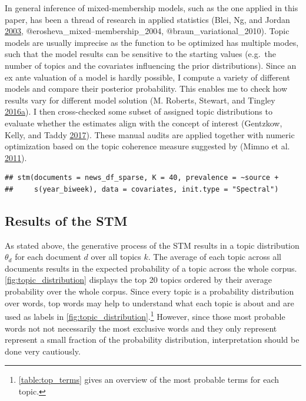 \documentclass[
]{article}
\begin{document}
In general inference of mixed-membership models, such as the one applied
in this paper, has been a thread of research in applied statistics
(Blei, Ng, and Jordan \protect\hyperlink{ref-blei_latent_2003}{2003},
@erosheva\_mixed--membership\_2004, @braun\_variational\_2010). Topic
models are usually imprecise as the function to be optimized has
multiple modes, such that the model results can be sensitive to the
starting values (e.g.~the number of topics and the covariates
influencing the prior distributions). Since an ex ante valuation of a
model is hardly possible, I compute a variety of different models and
compare their posterior probability. This enables me to check how
results vary for different model solution (M. Roberts, Stewart, and
Tingley
\protect\hyperlink{ref-roberts_navigating_2016}{2016}\protect\hyperlink{ref-roberts_navigating_2016}{a}).
I then cross-checked some subset of assigned topic distributions to
evaluate whether the estimates align with the concept of interest
(Gentzkow, Kelly, and Taddy
\protect\hyperlink{ref-gentzkow_text_2017}{2017}). These manual audits
are applied together with numeric optimization based on the topic
coherence measure suggested by (Mimno et al.
\protect\hyperlink{ref-mimno_optimizing_2011}{2011}).

\begin{verbatim}
## stm(documents = news_df_sparse, K = 40, prevalence = ~source + 
##     s(year_biweek), data = covariates, init.type = "Spectral")
\end{verbatim}

\hypertarget{results-of-the-stm}{%
\subsection{Results of the STM}\label{results-of-the-stm}}

As stated above, the generative process of the STM results in a topic
distribution \(\theta_d\) for each document \(d\) over all topics \(k\).
The average of each topic across all documents results in the expected
probability of a topic across the whole corpus.
\autoref{fig:topic_distribution} displays the top 20 topics ordered by
their average probability over the whole corpus. Since every topic is a
probability distribution over words, top words may help to understand
what each topic is about and are used as labels in
\autoref{fig:topic_distribution}.\footnote{\autoref{table:top_terms}
  gives an overview of the most probable terms for each topic.} However,
since those most probable words not not necessarily the most exclusive
words and they only represent represent a small fraction of the
probability distribution, interpretation should be done very cautiously.
\end{document}
